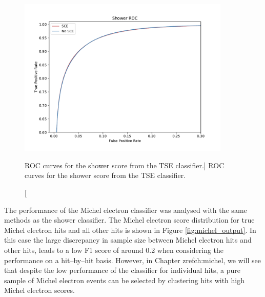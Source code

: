 \begin{figure}
	\centering
	\includegraphics[width=0.9\textwidth]{figures/show_roc_comparison.pdf}
	\caption
	[ROC curves for the shower score from the TSE classifier.]
	{ROC curves for the shower score from the TSE classifier.}
	\label{fig:show_roc}
\end{figure}

The performance of the Michel electron classifier was analysed with the same
methods as the shower classifier. The Michel electron score distribution for
true Michel electron hits and all other hits is shown in Figure
\ref{fig:michel_output}. In this case the large discrepancy in sample size
between Michel electron hits and other hits, leads to a low F1 score of around
0.2 when considering the performance on a hit--by--hit basis. However, in
Chapter zref{ch:michel}, we will see that despite the low performance of the
classifier for individual hits, a pure sample of Michel electron events can be
selected by clustering hits with high Michel electron scores.

